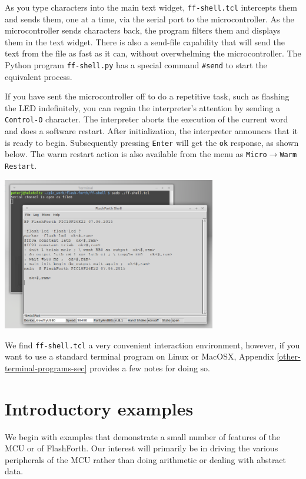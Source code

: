 \documentclass[12pt,a4paper]{article}
\begin{document}
\medskip\noindent
As you type characters into the main text widget, \verb!ff-shell.tcl! intercepts them and sends them, 
one at a time, via the serial port to the microcontroller.
As the microcontroller sends characters back, the program filters them and displays them in the text widget.
There is also a send-file capability that will send the text from the file
as fast as it can, without overwhelming the microcontroller.
The Python program \verb!ff-shell.py! has a special command \verb!#send! to start the equivalent process.

\medskip\noindent
If you have sent the microcontroller off to do a repetitive task, such as flashing the LED indefinitely,
you can regain the interpreter's attention by sending a \verb!Control-O! character.
The interpreter aborts the execution of the current word and does a software restart. 
After initialization, the interpreter announces that it is ready to begin.
Subsequently pressing \verb!Enter! will get the \verb!ok! response, as shown below.
The warm restart action is also available from the menu as \verb!Micro!$\rightarrow$\verb!Warm Restart!.

\bigskip
\noindent
\begin{center}
\includegraphics[width=0.7\textwidth]{../figs/ff-shell-tcl-control-O-pic18.png}
\end{center}

\medskip\noindent
We find \verb!ff-shell.tcl! a very convenient interaction environment, however,
if you want to use a standard terminal program on Linux or MacOSX, 
Appendix \ref{other-terminal-programs-sec} provides a few notes for doing so.


\newpage
\section{Introductory examples}
%
We begin with examples that demonstrate a small number of features of the MCU 
or of FlashForth.
Our interest will primarily be in driving the various peripherals of the MCU
rather than doing arithmetic or dealing with abstract data.
\end{document}
